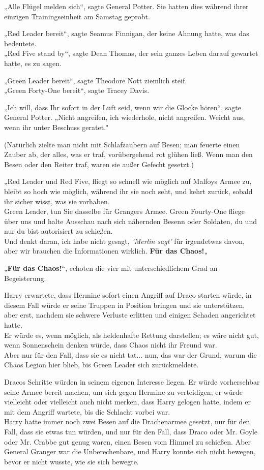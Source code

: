{„Alle Flügel melden sich“, sagte General Potter. Sie hatten dies während ihrer einzigen Trainingseinheit am Samstag geprobt.

„Red Leader bereit“, sagte Seamus Finnigan, der keine Ahnung hatte, was das bedeutete.\\ „Red Five stand by“, sagte Dean Thomas, der sein ganzes Leben darauf gewartet hatte, es zu sagen.

„Green Leader bereit“, sagte Theodore Nott ziemlich steif.\\ „Green Forty-One bereit“, sagte Tracey Davis.

„Ich will, dass Ihr sofort in der Luft seid, wenn wir die Glocke hören“, sagte General Potter. „Nicht angreifen, ich wiederhole, nicht angreifen. Weicht aus, wenn ihr unter Beschuss geratet."

(Natürlich zielte man nicht mit Schlafzaubern auf Besen; man feuerte einen Zauber ab, der alles, was er traf, vorübergehend rot glühen ließ. Wenn man den Besen oder den Reiter traf, waren sie außer Gefecht gesetzt.)

„Red Leader und Red Five, fliegt so schnell wie möglich auf Malfoys Armee zu, bleibt so hoch wie möglich, während ihr sie noch seht, und kehrt zurück, sobald ihr sicher wisst, was sie vorhaben.\\ Green Leader, tun Sie dasselbe für Grangers Armee. Green Fourty-One fliege über uns und halte Ausschau nach sich nähernden Besenn oder Soldaten, du und nur du bist autorisiert zu schießen.\\ Und denkt daran, ich habe nicht gesagt, \emph{'Merlin sagt'} für irgendetwas davon, aber wir brauchen die Informationen wirklich. \textbf{Für das Chaos!}„

„\textbf{Für das Chaos!}“, echoten die vier mit unterschiedlichem Grad an Begeisterung.

Harry erwartete, dass Hermine sofort einen Angriff auf Draco starten würde, in diesem Fall würde er seine Truppen in Position bringen und sie unterstützen, aber erst, nachdem sie schwere Verluste erlitten und einigen Schaden angerichtet hatte.\\ Er würde es, wenn möglich, als heldenhafte Rettung darstellen; es wäre nicht gut, wenn Sonnenschein denken würde, dass Chaos nicht ihr Freund war.\\ Aber nur für den Fall, dass sie es nicht tat... nun, das war der Grund, warum die Chaos Legion hier blieb, bis Green Leader sich zurückmeldete.

Dracos Schritte würden in seinem eigenen Interesse liegen. Er würde vorhersehbar seine Armee bereit machen, um sich gegen Hermine zu verteidigen; er würde vielleicht oder vielleicht auch nicht merken, dass Harry gelogen hatte, indem er mit dem Angriff wartete, bis die Schlacht vorbei war.\\ Harry hatte immer noch zwei Besen auf die Drachenarmee gesetzt, nur für den Fall, dass sie etwas tun würden, und nur für den Fall, dass Draco oder Mr. Goyle oder Mr. Crabbe gut genug waren, einen Besen vom Himmel zu schießen. Aber General Granger war die Unberechenbare, und Harry konnte sich nicht bewegen, bevor er nicht wusste, wie sie sich bewegte.

}
